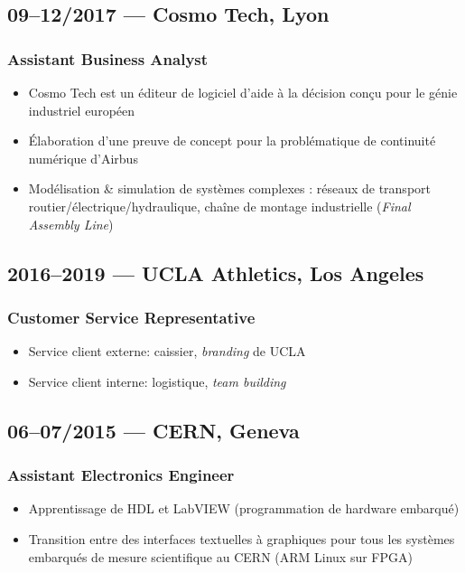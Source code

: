 \documentclass[10pt]{report}
\begin{document}
\subsection*{09--12/2017 --- Cosmo Tech, Lyon}
\subsubsection*{Assistant Business Analyst}
\begin{itemize}
    \item Cosmo Tech est un éditeur de logiciel d’aide à la décision conçu pour le génie industriel européen
    \item Élaboration d’une preuve de concept pour la problématique de continuité numérique d’Airbus
    \item Modélisation \& simulation de systèmes complexes : réseaux de transport routier/électrique/hydraulique, chaîne de montage industrielle (\textit{Final Assembly Line})
\end{itemize}
\subsection*{2016--2019 --- UCLA Athletics, Los Angeles}
\subsubsection*{Customer Service Representative}
\begin{itemize}
    \item Service client externe: caissier, \textit{branding} de UCLA
    \item Service client interne: logistique, \textit{team building}
\end{itemize}
\subsection*{06--07/2015 --- CERN, Geneva}
\subsubsection*{Assistant Electronics Engineer}
\begin{itemize}
    \item Apprentissage de HDL et LabVIEW (programmation de hardware embarqué)
    \item Transition entre des interfaces textuelles à graphiques pour tous les systèmes embarqués de mesure scientifique au CERN (ARM Linux sur FPGA)
\end{itemize}
\end{document}
